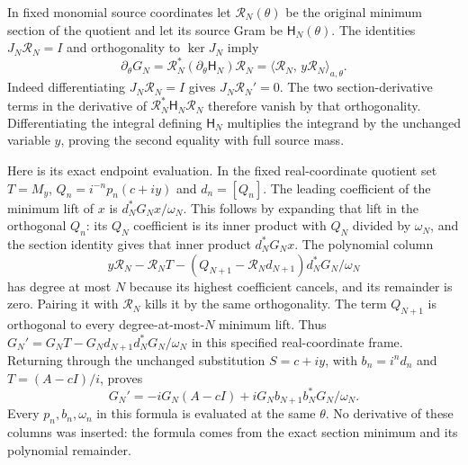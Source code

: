 \documentclass[11pt,a4paper]{article}
\begin{document}
In fixed monomial source coordinates let $\mathcal R_N(\theta)$
be the original minimum section of the quotient and let its source
Gram be $\mathsf H_N(\theta)$. The identities
$J_N\mathcal R_N=I$ and orthogonality to $\ker J_N$ imply
\[
 \partial_\theta G_N
   =\mathcal R_N^*(\partial_\theta\mathsf H_N)\mathcal R_N
   =\langle\mathcal R_N,\,y\mathcal R_N\rangle_{a,\theta}.
 \tag{MCP1}
\]
Indeed differentiating $J_N\mathcal R_N=I$ gives
$J_N\mathcal R_N'=0$. The two section-derivative terms in the
derivative of $\mathcal R_N^*\mathsf H_N\mathcal R_N$ therefore
vanish by that orthogonality. Differentiating the integral defining
$\mathsf H_N$ multiplies the integrand by the unchanged variable
$y$, proving the second equality with full source mass.

Here is its exact endpoint evaluation. In the fixed real-coordinate
quotient set $T=M_y$, $Q_n=i^{-n}p_n(c+iy)$ and $d_n=[Q_n]$.
The leading coefficient of the minimum lift of $x$ is
$d_N^*G_Nx/\omega_N$. This follows by expanding that lift in the
orthogonal $Q_n$: its $Q_N$ coefficient is its inner product
with $Q_N$ divided by $\omega_N$, and the section identity gives
that inner product $d_N^*G_Nx$. The polynomial column
\[
 y\mathcal R_N-\mathcal R_NT
       -(Q_{N+1}-\mathcal R_Nd_{N+1})d_N^*G_N/\omega_N
\]
has degree at most $N$ because its highest coefficient cancels,
and its remainder is zero. Pairing it with $\mathcal R_N$
kills it by the same orthogonality. The term $Q_{N+1}$ is
orthogonal to every degree-at-most-$N$ minimum lift. Thus
$G_N'=G_NT-G_Nd_{N+1}d_N^*G_N/\omega_N$ in this specified
real-coordinate frame. Returning through the unchanged substitution
$S=c+iy$, with $b_n=i^nd_n$ and $T=(A-cI)/i$, proves
\[
 G_N'=-iG_N(A-cI)
                   +iG_Nb_{N+1}b_N^*G_N/\omega_N.
 \tag{MCP2}
\]
Every $p_n,b_n,\omega_n$ in this formula is evaluated at the same
$\theta$. No derivative of these columns was inserted: the formula
comes from the exact section minimum and its polynomial remainder.
\end{document}

